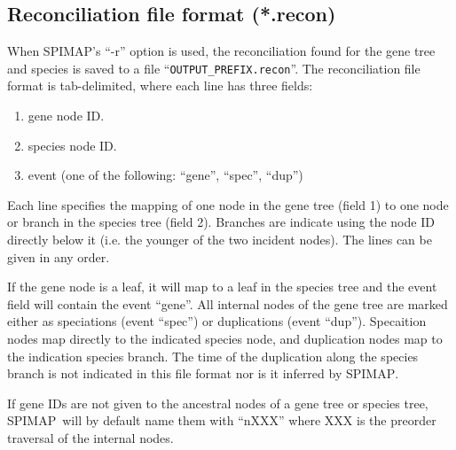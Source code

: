 \documentclass[11pt]{article}
\newcommand{\spimap}{{\sf\scshape SPIMAP}}
\begin{document}
\subsection{Reconciliation file format (*.recon)}
\label{sec:file:recon}

When \spimap's ``-r'' option is used, the reconciliation found for the
gene tree and species is saved to a file ``{\tt OUTPUT\_PREFIX.recon}''.
The reconciliation file format is tab-delimited, where each line has
three fields:
\begin{enumerate}[itemsep=0pt,topsep=0pt]
\item gene node ID.  
\item species node ID.
\item event (one of the following: ``gene'', ``spec'', ``dup'')
\end{enumerate}

Each line specifies the mapping of one node in the gene tree (field 1) to one 
node or branch in the species tree (field 2).  Branches are indicate using
the node ID directly below it (i.e. the younger of the two incident nodes).
The lines can be given in any order.

If the gene node is a leaf, it will map to a leaf in the species tree and
the event field will contain the event ``gene''.  All internal nodes of
the gene tree are marked either as speciations (event ``spec'') or
duplications (event ``dup'').  Specaition nodes map directly to the indicated
species node, and duplication nodes map to the indication species branch.
The time of the duplication along the species branch is not indicated
in this file format nor is it inferred by \spimap.

If gene IDs are not given to the ancestral nodes of a gene tree or species
tree, \spimap\ will by default name them with ``nXXX'' where XXX is the
preorder traversal of the internal nodes.
\end{document}
